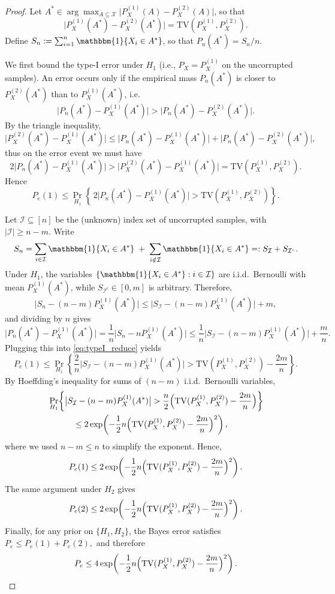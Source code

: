 \documentclass[11pt]{article}
\theoremstyle{plain}
\theoremstyle{definition}
\begin{document}
\begin{proof}
Let $A^*\in\arg\max_{A\subseteq\mathcal X}\bigl|P_X^{(1)}(A)-P_X^{(2)}(A)\bigr|$, so that
\[
\bigl|P_X^{(1)}(A^*)-P_X^{(2)}(A^*)\bigr|=\mathrm{TV}\!\left(P_X^{(1)},P_X^{(2)}\right).
\]
Define $S_n:=\sum_{i=1}^n \mathbbm{1}\{X_i\in A^*\}$, so that $P_n(A^*)=S_n/n$.

We first bound the type-I error under $H_1$ (i.e., $P_X=P_X^{(1)}$ on the uncorrupted samples).
An error occurs only if the empirical mass $P_n(A^*)$ is closer to $P_X^{(2)}(A^*)$ than to $P_X^{(1)}(A^*)$, i.e.
\[
\bigl|P_n(A^*)-P_X^{(1)}(A^*)\bigr|>\bigl|P_n(A^*)-P_X^{(2)}(A^*)\bigr|.
\]
By the triangle inequality,
\[
\bigl|P_X^{(2)}(A^*)-P_X^{(1)}(A^*)\bigr|
\le
\bigl|P_n(A^*)-P_X^{(1)}(A^*)\bigr|
+
\bigl|P_n(A^*)-P_X^{(2)}(A^*)\bigr|,
\]
thus on the error event we must have
\[
2\bigl|P_n(A^*)-P_X^{(1)}(A^*)\bigr|
>
\bigl|P_X^{(2)}(A^*)-P_X^{(1)}(A^*)\bigr|
=
\mathrm{TV}\!\left(P_X^{(1)},P_X^{(2)}\right).
\]
Hence
\begin{equation}\label{eq:typeI_reduce}
P_e(1)
\le
\Pr_{H_1}\!\left\{\,2\bigl|P_n(A^*)-P_X^{(1)}(A^*)\bigr|
>
\mathrm{TV}\!\left(P_X^{(1)},P_X^{(2)}\right)\right\}.
\end{equation}

Let $\mathcal I\subseteq[n]$ be the (unknown) index set of uncorrupted samples, with $|\mathcal I|\ge n-m$.
Write
\[
S_n = \sum_{i\in\mathcal I}\mathbbm{1}\{X_i\in A^*\} \;+\; \sum_{i\notin\mathcal I}\mathbbm{1}\{X_i\in A^*\}
=: S_{\mathcal I}+S_{\mathcal I^c}.
\]
Under $H_1$, the variables $\{\mathbbm{1}\{X_i\in A^*\}: i\in\mathcal I\}$ are i.i.d.\ Bernoulli with mean
$P_X^{(1)}(A^*)$, while $S_{\mathcal I^c}\in[0,m]$ is arbitrary.
Therefore,
\[
\bigl|S_n-(n-m)P_X^{(1)}(A^*)\bigr|
\le
\bigl|S_{\mathcal I}-(n-m)P_X^{(1)}(A^*)\bigr| + m,
\]
and dividing by $n$ gives
\[
\bigl|P_n(A^*)-P_X^{(1)}(A^*)\bigr|
=
\frac{1}{n}\bigl|S_n-nP_X^{(1)}(A^*)\bigr|
\le
\frac{1}{n}\bigl|S_{\mathcal I}-(n-m)P_X^{(1)}(A^*)\bigr|+\frac{m}{n}.
\]
Plugging this into \eqref{eq:typeI_reduce} yields
\[
P_e(1)
\le
\Pr_{H_1}\!\left\{
\frac{2}{n}\bigl|S_{\mathcal I}-(n-m)P_X^{(1)}(A^*)\bigr|
>
\mathrm{TV}\!\left(P_X^{(1)},P_X^{(2)}\right)-\frac{2m}{n}
\right\}.
\]
By Hoeffding's inequality for sums of $(n-m)$ i.i.d.\ Bernoulli variables,
\begin{align*}
	&\Pr_{H_1}\!\left\{
\bigl|S_{\mathcal I}-(n-m)P_X^{(1)}(A^*)\bigr|
>
\frac{n}{2}\Bigl(\mathrm{TV}(P_X^{(1)},P_X^{(2)})-\frac{2m}{n}\Bigr)
\right\}\\
&\quad\quad\quad\le
2\exp\!\left(
-\frac{1}{2}n\Bigl(\mathrm{TV}(P_X^{(1)},P_X^{(2)})-\frac{2m}{n}\Bigr)^2
\right),
\end{align*}
where we used $n-m\le n$ to simplify the exponent.
Hence,
\[
P_e(1)\le
2\exp\!\left(
-\frac{1}{2}n\Bigl(\mathrm{TV}(P_X^{(1)},P_X^{(2)})-\frac{2m}{n}\Bigr)^2
\right).
\]
The same argument under $H_2$ gives
\[
P_e(2)\le
2\exp\!\left(
-\frac{1}{2}n\Bigl(\mathrm{TV}(P_X^{(1)},P_X^{(2)})-\frac{2m}{n}\Bigr)^2
\right).
\]
Finally, for any prior on $\{H_1,H_2\}$, the Bayes error satisfies
\(
P_e \le P_e(1)+P_e(2),
\)
and therefore
\[
P_e \le
4\exp\!\left(
-\frac{1}{2}n\Bigl(\mathrm{TV}(P_X^{(1)},P_X^{(2)})-\frac{2m}{n}\Bigr)^2
\right).
\]
\end{proof}
\end{document}
